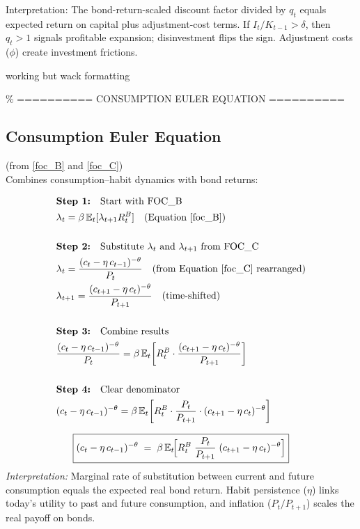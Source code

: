 \documentclass[11pt,preprint]{elsarticle}
\numberwithin{equation}{section}
\numberwithin{figure}{section}
\numberwithin{table}{section}
\begin{document}
Interpretation: The bond-return-scaled discount factor divided by
\(q_t\) equals expected return on capital plus adjustment-cost terms. If
\(I_t/K_{t-1}>\delta\), then \(q_t>1\) signals profitable expansion;
disinvestment flips the sign. Adjustment costs (\(\phi\)) create
investment frictions.

\newpage

working but wack formatting

\% ========== CONSUMPTION EULER EQUATION ==========

\subsection*{Consumption Euler Equation}

(from \eqref{foc_B} and \eqref{foc_C})\\
Combines consumption--habit dynamics with bond returns:

\begin{align*}
& \textbf{Step 1:} \quad \text{Start with FOC\_B} \\
& \lambda_t = \beta\,\mathbb{E}_t[\lambda_{t+1}R_t^B] \quad \text{(Equation \ref{foc_B})} \\
& \\
& \textbf{Step 2:} \quad \text{Substitute } \lambda_t \text{ and } \lambda_{t+1} \text{ from FOC\_C} \\
& \lambda_t = \frac{(c_t - \eta\,c_{t-1})^{-\theta}}{P_t} \quad \text{(from Equation \ref{foc_C} rearranged)} \\
& \lambda_{t+1} = \frac{(c_{t+1} - \eta\,c_t)^{-\theta}}{P_{t+1}} \quad \text{(time-shifted)} \\
& \\
& \textbf{Step 3:} \quad \text{Combine results} \\
& \frac{(c_t - \eta\,c_{t-1})^{-\theta}}{P_t} = \beta\,\mathbb{E}_t\!\left[ R_t^B \cdot \frac{(c_{t+1} - \eta\,c_t)^{-\theta}}{P_{t+1}} \right] \\
& \\
& \textbf{Step 4:} \quad \text{Clear denominator} \\
& (c_t - \eta\,c_{t-1})^{-\theta} = \beta\,\mathbb{E}_t\!\left[ R_t^B \cdot \frac{P_t}{P_{t+1}} \cdot (c_{t+1} - \eta\,c_t)^{-\theta} \right]
\end{align*}

\[
\boxed{
  (c_t - \eta\,c_{t-1})^{-\theta}
  \;=\;
  \beta\,\mathbb{E}_t\!\Bigl[
    R_t^B \;\frac{P_t}{P_{t+1}}\;(c_{t+1} - \eta\,c_t)^{-\theta}
  \Bigr]
}
\] \textit{Interpretation:} Marginal rate of substitution between
current and future consumption equals the expected real bond return.
Habit persistence (\(\eta\)) links today's utility to past and future
consumption, and inflation (\(P_t/P_{t+1}\)) scales the real payoff on
bonds.
\end{document}
